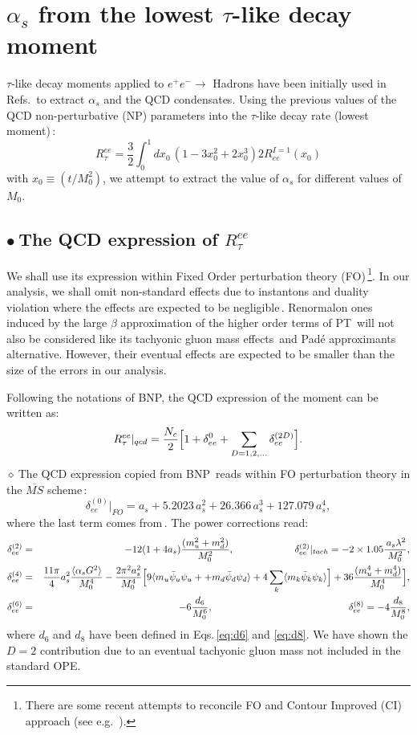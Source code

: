 \documentclass[review]{elsarticle}
\def\beq{\begin{equation}}
\def\eeq{\end{equation}}
\def\bea{\begin{eqnarray}}
\def\eea{\end{eqnarray}}
\def\nnb{\nonumber}
\def\nnb{\nonumber}
\def\la{\langle}
\def\ra{\rangle}
\def\b{$\bullet~$}
\def\d{$\diamond~$}
\begin{document}
  \section{$\alpha_s$ from the lowest $\tau$-like decay moment}
  $\tau$-like decay moments applied to $e^+e^-\to$ Hadrons have been initially used in Refs.\,\cite{SNPICH,SN95} to extract $\alpha_s$ and the QCD condensates. 
  Using the previous values of the QCD non-perturbative (NP) parameters into the $\tau$-like decay rate (lowest moment)\,\cite{BNP}:
  \beq
  R^{ee}_{\tau}=\frac{3}{2}\int_0^{1} dx_0\, (1-3x_0^2+2x_0^3)2R^{I=1}_{ee}(x_0)
  \eeq
  with $x_0\equiv (t/M^2_0)$, we attempt to extract the value of $\alpha_s$ for different values of $M_0$.
  \subsection*{\b The QCD expression of $ R^{ee}_{\tau}$}
 We shall use its expression  within Fixed Order perturbation theory (FO)\,\footnote{There are some recent attempts to reconcile FO and Contour Improved (CI) approach (see e.g. \,\cite{JAMIN}).}. In our analysis, we shall omit non-standard effects due to  instantons and duality violation where the effects are expected to be negligible\,\cite{PICH2,SNTAU}.  Renormalon ones induced by the large $\beta$ approximation of the higher order terms of PT\,\cite{RENORM,AYALA} will not also be considered like its tachyonic gluon mass effects\,\cite{ZAKA} and Pad\'e approximants alternative. However, their eventual effects are expected to be smaller than the size of the errors in our analysis. 
  
  Following the notations of BNP, the QCD expression of the moment can be written as:
  \beq
  R^{ee}_{\tau}\vert_{qcd}= \frac{N_c}{2}\Big{[} 1+\delta_{ee}^{0}+\sum_{D=1,2,\dots}\delta_{ee}^{(2D)}\Big{]}.
  \eeq
 \d The QCD expression copied from BNP\,\cite{BNP} reads within FO perturbation theory in the $\overline{MS}$ scheme\,:
  \beq
  \delta^{(0)}_{ee}\vert_{FO}=a_s+5.2023\,a_s^2+26.366\,a_s^3+ 127.079\,a_s^4,
  \eeq
  where the last term comes from\,\cite{CHET4}.  The power corrections read:
  \bea
   \delta^{(2)}_{ee}&=&-12(1+4a_s)\frac{(m_u^2+m_d^2)}{M_0^2},\,\,\,\,\,\,\,\,\,\,\,\,\,\,\,\,\,\,\,\,\,\,\,\,\,\,\,\,\,\,\,\,\,\,\,\,\,
   \delta^{(2)}_{ee}\vert_{tach}=-2\times 1.05\frac{\,a_s\lambda^2}{M_0^2},\nnb\\
   \delta^{(4)}_{ee}&=&\frac{11\pi}{4}a_s^2\frac{\la\alpha_s G^2\ra}{M_0^4}
  -\frac{2\pi^2a_s^2}{M_0^4}\Big{[} 9\la m_u\bar \psi_u\psi_u++m_d\bar\psi_d\psi_d \ra+4\sum_k \la m_k\bar \psi_k\psi_k\ra\Big{]}+36\frac{(m_u^4+m_d^4)}{M_0^4}\Big{]},\nnb\\
   \delta^{(6)}_{ee}&=& -6\frac{d_6}{M_0^6},\,\,\,\,\,\,\,\,\,\,\,\,\,\,\,\,\,\,\,\,\,\,\,\,\,\,\,\,\,\,\,\,\,\,\,\,\,\,\,\,\,\,\,\,\,\,\,\,\,\,\,\,\,\,\,\,\,\,\,\,\,\,\,\,\,\,\,\,\,\,\,\,\,\,\,\,\,\,\,\,\,\,\,
   \delta_{ee}^{(8)}= -4\frac{d_8}{M_0^8},
  \eea
  where $d_{6}$ and $d_{8}$ have been defined in Eqs.\,\ref{eq:d6} and \ref{eq:d8}. We have shown the $D=2$ contribution due to an eventual tachyonic gluon mass not included in the standard OPE. 
  
\end{document}

